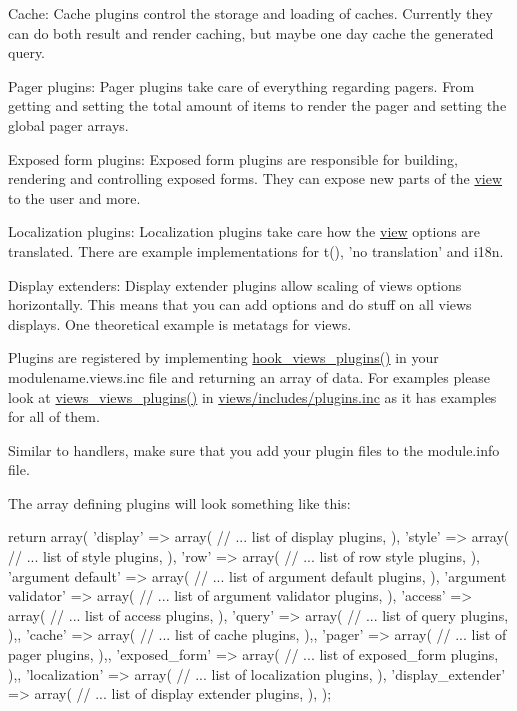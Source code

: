 \begin{DoxyItemize}
\item Cache: Cache plugins control the storage and loading of caches. Currently they can do both result and render caching, but maybe one day cache the generated query.
\item Pager plugins: Pager plugins take care of everything regarding pagers. From getting and setting the total amount of items to render the pager and setting the global pager arrays.
\item Exposed form plugins: Exposed form plugins are responsible for building, rendering and controlling exposed forms. They can expose new parts of the \hyperlink{classview}{view} to the user and more.
\item Localization plugins: Localization plugins take care how the \hyperlink{classview}{view} options are translated. There are example implementations for t(), 'no translation' and i18n.
\item Display extenders: Display extender plugins allow scaling of views options horizontally. This means that you can add options and do stuff on all views displays. One theoretical example is metatags for views.
\end{DoxyItemize}

Plugins are registered by implementing \hyperlink{group__views__hooks_ga23f6e9972b2ed84fc54b7ff63f44477d}{hook\_\-views\_\-plugins()} in your modulename.views.inc file and returning an array of data. For examples please look at \hyperlink{views_2includes_2plugins_8inc_a89b4d3bd8e15dca9a33e85b203218b8d}{views\_\-views\_\-plugins()} in \hyperlink{views_2includes_2plugins_8inc}{views/includes/plugins.inc} as it has examples for all of them.

Similar to handlers, make sure that you add your plugin files to the module.info file.

The array defining plugins will look something like this: 
\begin{DoxyCode}
 return array(
   'display' => array(
     // ... list of display plugins,
    ),
   'style' => array(
     // ... list of style plugins,
    ),
   'row' => array(
     // ... list of row style plugins,
    ),
   'argument default' => array(
     // ... list of argument default plugins,
    ),
   'argument validator' => array(
     // ... list of argument validator plugins,
    ),
    'access' => array(
     // ... list of access plugins,
    ),
    'query' => array(
      // ... list of query plugins,
     ),,
    'cache' => array(
      // ... list of cache plugins,
     ),,
    'pager' => array(
      // ... list of pager plugins,
     ),,
    'exposed_form' => array(
      // ... list of exposed_form plugins,
     ),,
    'localization' => array(
      // ... list of localization plugins,
     ),
    'display_extender' => array(
      // ... list of display extender plugins,
     ),
 );
\end{DoxyCode}


